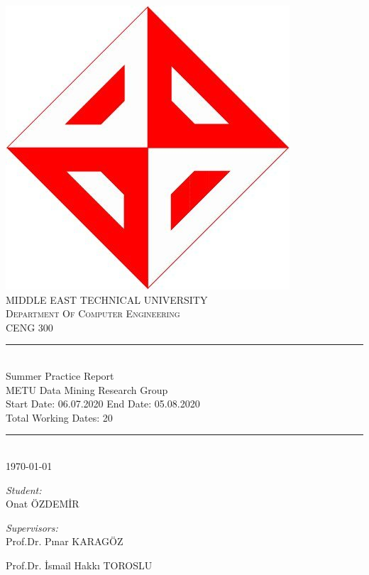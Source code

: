 \documentclass[12pt]{article}
\begin{document}
	\begin{titlepage}
		\newcommand{\HRule}{\rule{\linewidth}{0.1mm}} 
		\center 
		\includegraphics[scale=0.12]{ceng} \\
		\vspace{1cm}
		\textsc{\Large MIDDLE EAST TECHNICAL UNIVERSITY}\\[0.5cm]
		\textsc{\large Department Of Computer Engineering}\\[0.5cm]
		\textsc{\large CENG 300}\\
		\HRule \\[0.4cm]
		{ \huge \Large Summer Practice Report }\\[0.4cm]
		METU Data Mining Research Group \\
		Start Date: 06.07.2020\hspace{25px}  End Date: 05.08.2020\\
		Total Working Dates: 20
		
		\HRule \\[0.3cm]
		{\today}\\[1.2cm]
		
		
		\begin{minipage}{0.4\textwidth}
			\begin{flushleft} \large
				
				\emph{Student:}\\
				Onat ÖZDEMİR
			\end{flushleft}
			
			
		\end{minipage}
		\begin{minipage}{0.4\textwidth}
			\begin{flushright} \large
				\emph{Supervisors:} \\
				Prof.Dr. Pınar KARAGÖZ \\
			\end{flushright}
			\begin{flushright} \large
				Prof.Dr. İsmail Hakkı TOROSLU \\
			\end{flushright}
		\end{minipage}\\[1cm]
	\end{titlepage}
	
\end{document}
